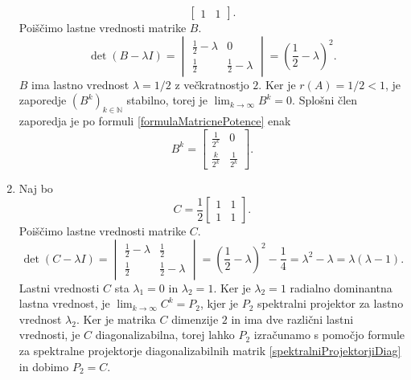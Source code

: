 \documentclass[mat1]{fmfdelo}
\newcommand{\N}{\mathbb N}
\begin{document}
\begin{zgled}
\begin{enumerate}
\begin{equation*}
\begin{bmatrix}
                1 & 1
            \end{bmatrix}.
        \end{equation*}
        Poiščimo lastne vrednosti matrike $B$.
        \begin{equation*}
            \det (B - \lambda I) =
            \begin{vmatrix}
                \frac{1}{2}-\lambda & 0 \\
                \frac{1}{2} & \frac{1}{2}-\lambda
            \end{vmatrix}
            = \left(\frac{1}{2}-\lambda\right)^2.
        \end{equation*}
        $B$ ima lastno vrednost $\lambda = 1/2$ z večkratnostjo $2$. Ker je $r(A) = 1/2 < 1$, je zaporedje $(B^k)_{k\in\N}$ stabilno, torej je $\lim_{k\rightarrow\infty} B^k = 0$. Splošni člen zaporedja je po formuli \eqref{formulaMatricnePotence} enak
        \begin{equation*}
            B^k =
            \begin{bmatrix}
                \frac{1}{2^k} & 0 \\
                \frac{k}{2^k} & \frac{1}{2^k}
            \end{bmatrix}.
        \end{equation*}
        \item Naj bo
        \begin{equation*}
            C = \frac{1}{2}
            \begin{bmatrix}
                1 & 1 \\
                1 & 1
            \end{bmatrix}.
        \end{equation*}
        Poiščimo lastne vrednosti matrike $C$.
        \begin{equation*}
            \det (C - \lambda I) =
            \begin{vmatrix}
                \frac{1}{2}-\lambda & \frac{1}{2} \\
                \frac{1}{2} & \frac{1}{2}-\lambda
            \end{vmatrix}
            = \left(\frac{1}{2}-\lambda\right)^2-\frac{1}{4} = \lambda^2-\lambda = \lambda(\lambda - 1).
        \end{equation*}
        Lastni vrednosti $C$ sta $\lambda_1 = 0$ in $\lambda_2 = 1$. Ker je $\lambda_2 = 1$ radialno dominantna lastna vrednost, je $\lim_{k\rightarrow\infty} C^k = P_2$, kjer je $P_2$ spektralni projektor za lastno vrednost $\lambda_2$. Ker je matrika $C$ dimenzije $2$ in ima dve različni lastni vrednosti, je $C$ diagonalizabilna, torej lahko $P_2$ izračunamo s pomočjo formule za spektralne projektorje diagonalizabilnih matrik \eqref{spektralniProjektorjiDiag} in dobimo $P_2 = C$.

\end{enumerate}
\end{zgled}
\end{document}
